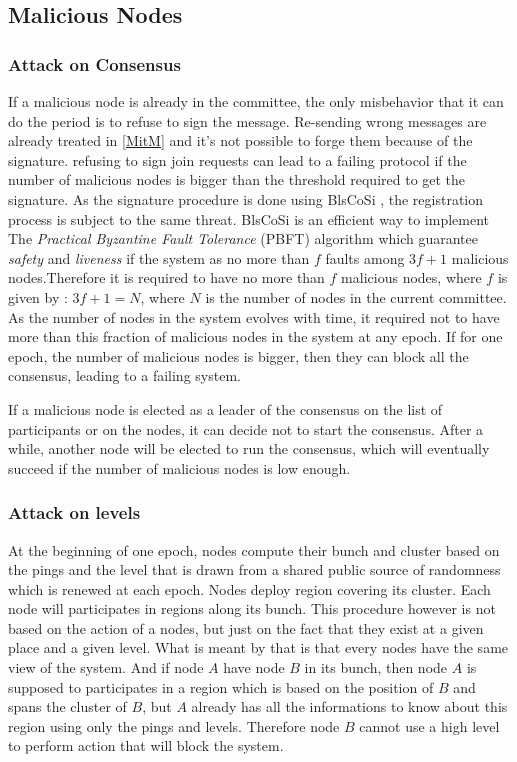\documentclass[a4paper,11pt,oneside]{report}
\begin{document}
\subsection{Malicious Nodes}
\subsubsection{Attack on Consensus}
If a malicious node is already in the committee, the only misbehavior that it
can do the period is to refuse to sign the message. Re-sending wrong messages
are already treated in \autoref{MitM} and it's not possible to forge them because
of the signature. refusing to sign join requests can lead to a failing protocol
if the number of malicious nodes is bigger than the threshold required to get
the signature. As the signature procedure is done using BlsCoSi \cite{Boneh2018},
the registration process is subject to the same threat. BlsCoSi
\cite{Boneh2018} is an efficient way to implement The \textit{Practical
Byzantine Fault Tolerance} (PBFT) \cite{Castro1999} algorithm which guarantee
\textit{safety} and \textit{liveness} if the system as no more than $f$ faults
among $3f+1$ malicious nodes.Therefore it is required to have no more than $f$
malicious nodes, where $f$ is given by : $3f + 1 = N$, where $N$ is the number
of nodes in the current committee. As the number of nodes in the system evolves
with time, it required not to have more than this fraction of malicious nodes
in the system at any epoch. If for one epoch, the number of malicious nodes is
bigger, then they can block all the consensus, leading to a failing system. 

If a malicious node is elected as a leader of the consensus on the list of
participants or on the nodes, it can decide not to start the consensus. After a
while, another node will be elected to run the consensus, which will eventually
succeed if the number of malicious nodes is low enough.

\subsubsection{Attack on levels} \label{sec:ControlePlane-Threat-Model}
At the beginning of one epoch, nodes compute their bunch and cluster based on
the pings and the level that is drawn from a shared public source of randomness
which is renewed at each epoch. Nodes deploy region covering its cluster. Each
node will participates in regions along its bunch. This procedure however is
not based on the action of a nodes, but just on the fact that they exist at a
given place and a given level. What is meant by that is that every nodes have
the same view of the system. And if node $A$ have node $B$ in its bunch, then
node $A$ is supposed to participates in a region which is based on the position
of $B$ and spans the cluster of $B$, but $A$ already has all the informations
to know about this region using only the pings and levels. Therefore node $B$
cannot use a high level to perform action that will block the system. 
\end{document}
